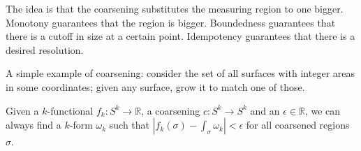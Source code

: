 \documentclass[10pt, onecolumn, longbibliography, nofootinbib]{revtex4-2}
\begin{document}
\begin{remark}
	The idea is that the coarsening substitutes the measuring region to one bigger. Monotony guarantees that the region is bigger. Boundedness guarantees that there is a cutoff in size at a certain point. Idempotency guarantees that there is a desired resolution.
	
	A simple example of coarsening: consider the set of all surfaces with integer areas in some coordinates; given any surface, grow it to match one of those.
\end{remark}

\begin{desid}
	Given a $k$-functional $f_k : S^k \to \mathbb{R}$, a coarsening $c : S^k \to S^k$ and an $\epsilon \in \mathbb{R}$, we can always find a $k$-form $\omega_k$ such that $| f_k(\sigma) - \int_\sigma \omega_k | < \epsilon$ for all coarsened regions $\sigma$.
\end{desid}





\end{document}
